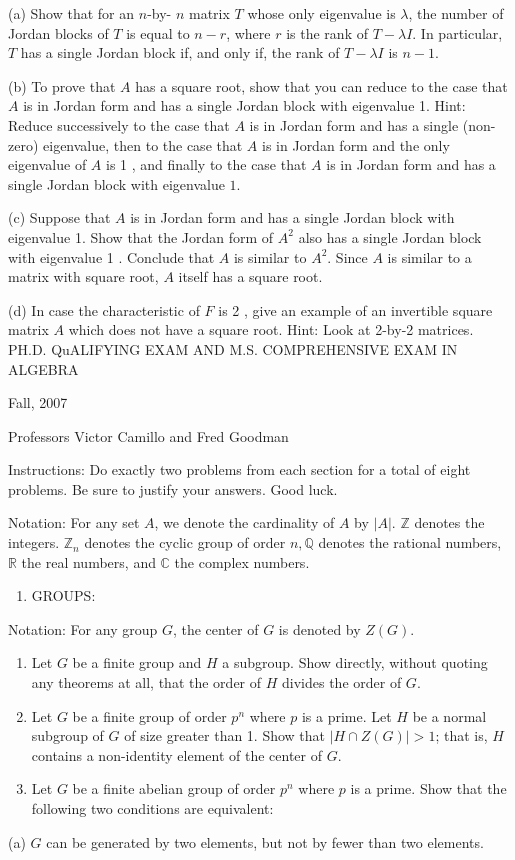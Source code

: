 \documentclass[10pt]{article}
\begin{document}
(a) Show that for an $n$-by- $n$ matrix $T$ whose only eigenvalue is $\lambda$, the number of Jordan blocks of $T$ is equal to $n-r$, where $r$ is the rank of $T-\lambda I$. In particular, $T$ has a single Jordan block if, and only if, the rank of $T-\lambda I$ is $n-1$.

(b) To prove that $A$ has a square root, show that you can reduce to the case that $A$ is in Jordan form and has a single Jordan block with eigenvalue 1. Hint: Reduce successively to the case that $A$ is in Jordan form and has a single (non-zero) eigenvalue, then to the case that $A$ is in Jordan form and the only eigenvalue of $A$ is 1 , and finally to the case that $A$ is in Jordan form and has a single Jordan block with eigenvalue $1 .$

(c) Suppose that $A$ is in Jordan form and has a single Jordan block with eigenvalue 1. Show that the Jordan form of $A^{2}$ also has a single Jordan block with eigenvalue 1 . Conclude that $A$ is similar to $A^{2}$. Since $A$ is similar to a matrix with square root, $A$ itself has a square root.

(d) In case the characteristic of $F$ is 2 , give an example of an invertible square matrix $A$ which does not have a square root. Hint: Look at 2-by-2 matrices. PH.D. QuALIFYING EXAM AND M.S. COMPREHENSIVE EXAM IN ALGEBRA

Fall, 2007

Professors Victor Camillo and Fred Goodman

Instructions: Do exactly two problems from each section for a total of eight problems. Be sure to justify your answers. Good luck.

Notation: For any set $A$, we denote the cardinality of $A$ by $|A|$. $\mathbb{Z}$ denotes the integers. $\mathbb{Z}_{n}$ denotes the cyclic group of order $n, \mathbb{Q}$ denotes the rational numbers, $\mathbb{R}$ the real numbers, and $\mathbb{C}$ the complex numbers.

\begin{enumerate}
  \item GROUPS:
\end{enumerate}
Notation: For any group $G$, the center of $G$ is denoted by $Z(G)$.

\begin{enumerate}
  \item Let $G$ be a finite group and $H$ a subgroup. Show directly, without quoting any theorems at all, that the order of $H$ divides the order of $G$.

  \item Let $G$ be a finite group of order $p^{n}$ where $p$ is a prime. Let $H$ be a normal subgroup of $G$ of size greater than 1. Show that $|H \cap Z(G)|>1$; that is, $H$ contains a non-identity element of the center of $G$.

  \item Let $G$ be a finite abelian group of order $p^{n}$ where $p$ is a prime. Show that the following two conditions are equivalent:

\end{enumerate}
(a) $G$ can be generated by two elements, but not by fewer than two elements.
\end{document}
